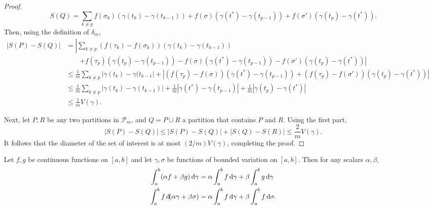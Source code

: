 \begin{proof}
			\[ S(Q) = \sum_{k \ne p} f(\sigma_k) ( \gamma(t_k) - \gamma(t_{k-1}) ) + f(\sigma) \left( \gamma(t^*) - \gamma(t_{p-1}) \right) + f(\sigma') \left( \gamma(t_p) - \gamma(t^*) \right). \]
			Then, using the definition of $\delta_m$,
			\begin{align*}
				\left| S(P) - S(Q) \right| &= \left| \sum_{k\ne p} \left( f(\tau_k) - f(\sigma_k) \right) \left( \gamma(t_k) - \gamma(t_{k-1}) \right) \right. \\
				&\qquad\left. + f(\tau_p) (\gamma(t_p) - \gamma(t_{p-1})) - f(\sigma)(\gamma(t^*) - \gamma(t_{p-1})) - f(\sigma')( \gamma(t_p) - \gamma(t^*) ) \right| \\
				&\le \frac{1}{m} \sum_{k \ne p} |\gamma(t_k) - \gamma(t_{k-1}| + \left| \left( f(\tau_p) - f(\sigma) \right) \left( \gamma(t^*) - \gamma(t_{p-1}) \right) + \left( f(\tau_p) - f(\sigma') \right) \left( \gamma(t_p) - \gamma(t^*) \right) \right| \\
				&\le \frac{1}{m} \sum_{k \ne p} \left| \gamma(t_k) - \gamma(t_{k-1}) \right| + \frac{1}{m} \left| \gamma(t^*) - \gamma(t_{p-1}) \right| + \frac{1}{m} \left| \gamma(t_p) - \gamma(t^*) \right| \\
				&\le \frac{1}{m} V(\gamma).
			\end{align*}

			Next, let $P,R$ be any two partitions in $\mathcal{P}_m$, and $Q = P \cup R$ a partition that contains $P$ and $R$. Using the first part,
			\[ |S(P) - S(Q)| \le |S(P) - S(Q)| + |S(Q) - S(R)| \le \frac{2}{m} V(\gamma). \]
			It follows that the diameter of the set of interest is at most $(2/m) V(\gamma)$, completing the proof.
		\end{proof}

		\begin{ftheo}
			Let $f,g$ be continuous functions on $[a,b]$ and let $\gamma,\sigma$ be functions of bounded variation on $[a,b]$. Then for any scalars $\alpha,\beta$,
			\begin{align*}
				\int_a^b (\alpha f + \beta g) \dif \gamma &= \alpha \int_a^b f \dif \gamma + \beta \int_a^b g \dif \gamma \\
				\int_a^b f \dif( \alpha\gamma + \beta\sigma ) &= \alpha\int_a^b f \dif \gamma + \beta\int_a^b f \dif \sigma.
			\end{align*}
		\end{ftheo}


